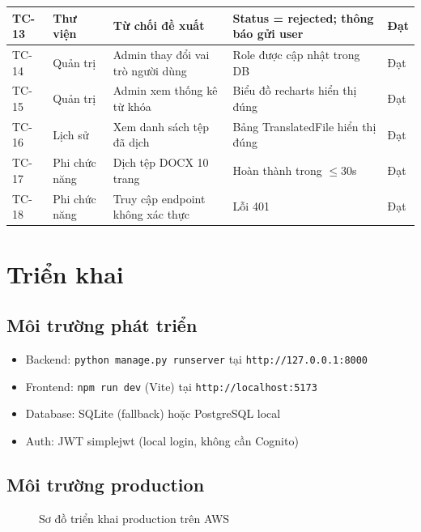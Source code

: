 \begin{table}[H]
\begin{tabularx}{\textwidth}{|l|l|X|X|l|}
\hline
TC-13 & Thư viện & Từ chối đề xuất & Status = rejected; thông báo gửi user & Đạt \\
\hline
TC-14 & Quản trị & Admin thay đổi vai trò người dùng & Role được cập nhật trong DB & Đạt \\
\hline
TC-15 & Quản trị & Admin xem thống kê từ khóa & Biểu đồ recharts hiển thị đúng & Đạt \\
\hline
TC-16 & Lịch sử & Xem danh sách tệp đã dịch & Bảng TranslatedFile hiển thị đúng & Đạt \\
\hline
TC-17 & Phi chức năng & Dịch tệp DOCX 10 trang & Hoàn thành trong $\leq 30$s & Đạt \\
\hline
TC-18 & Phi chức năng & Truy cập endpoint không xác thực & Lỗi 401 & Đạt \\
\hline
\end{tabularx}
\end{table}

\section{Triển khai}

\subsection{Môi trường phát triển}

\begin{itemize}
  \item Backend: \texttt{python manage.py runserver} tại \texttt{http://127.0.0.1:8000}
  \item Frontend: \texttt{npm run dev} (Vite) tại \texttt{http://localhost:5173}
  \item Database: SQLite (fallback) hoặc PostgreSQL local
  \item Auth: JWT simplejwt (local login, không cần Cognito)
\end{itemize}

\subsection{Môi trường production}

\begin{figure}[H]
\centering
{}
\caption{Sơ đồ triển khai production trên AWS}
\label{fig:deployment}
\end{figure}

